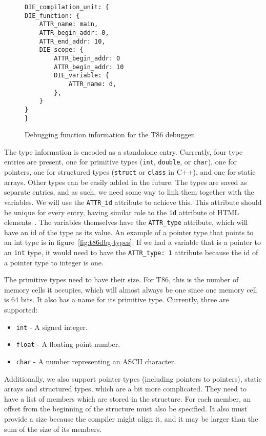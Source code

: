 \begin{figure}
    \begin{lstlisting}
DIE_compilation_unit: {
DIE_function: {
    ATTR_name: main,
    ATTR_begin_addr: 0,
    ATTR_end_addr: 10,
    DIE_scope: {
        ATTR_begin_addr: 0
        ATTR_begin_addr: 10
        DIE_variable: {
            ATTR_name: d,
        },
    }
}
}
    \end{lstlisting}
    \caption{Debugging function information for the T86 debugger.}
    \label{fig:t86dbg-die}
\end{figure}

The type information is encoded as a standalone entry. Currently, four type
entries are present, one for primitive types (\texttt{int}, \texttt{double}, or
\texttt{char}), one for pointers, one for structured types (\texttt{struct} or
\texttt{class} in C++), and one for static arrays. Other types can be easily
added in the future. The types are saved as separate entries, and as such, we
need some way to link them together with the variables. We will use the
\verb|ATTR_id| attribute to achieve this. This attribute should be unique for
every entry, having similar role to the \texttt{id} attribute of HTML
elements~\cite{html4}. The variables themselves have the \verb|ATTR_type|
attribute, which will have an id of the type as its value. An example of a
pointer type that points to an int type is in figure~\ref{fig:t86dbg-types}. If
we had a variable that is a pointer to an \texttt{int} type, it would need to
have the \verb|ATTR_type: 1| attribute because the id of a pointer type to
integer is one.

The primitive types need to have their size. For T86, this is the number of
memory cells it occupies, which will almost always be one since one memory cell
is 64 bits. It also has a name for its primitive type. Currently, three
are supported:
\begin{itemize}
    \item \texttt{int} - A signed integer.
    \item \texttt{float} - A floating point number.
    \item \texttt{char} - A number representing an ASCII character.
\end{itemize}

Additionally, we also support pointer types (including pointers to pointers),
static arrays and structured types, which are a bit more complicated. They need
to have a list of members which are stored in the structure. For each member,
an offset from the beginning of the structure must also be specified. It also
must provide a size because the compiler might align it, and it may be larger
than the sum of the size of its members.

